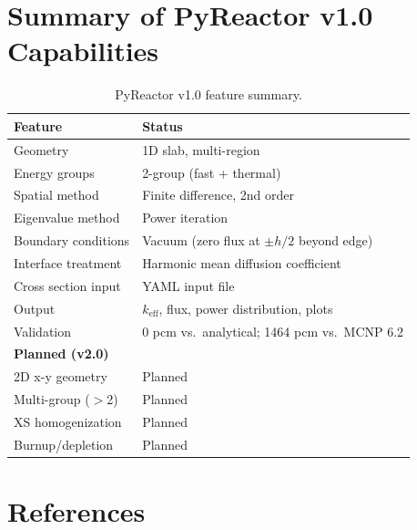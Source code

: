 \documentclass[12pt,a4paper]{article}
\newcommand{\keff}{k_{\mathrm{eff}}}
\begin{document}
\section{Summary of PyReactor v1.0 Capabilities}

\begin{table}[h!]
\centering
\begin{tabular}{ll}
\toprule
\textbf{Feature} & \textbf{Status} \\
\midrule
Geometry              & 1D slab, multi-region \\
Energy groups         & 2-group (fast + thermal) \\
Spatial method        & Finite difference, 2nd order \\
Eigenvalue method     & Power iteration \\
Boundary conditions   & Vacuum (zero flux at $\pm h/2$ beyond edge) \\
Interface treatment   & Harmonic mean diffusion coefficient \\
Cross section input   & YAML input file \\
Output                & $\keff$, flux, power distribution, plots \\
Validation            & 0 pcm vs.\ analytical; 1464 pcm vs.\ MCNP 6.2 \\
\midrule
\textbf{Planned (v2.0)} & \\
\midrule
2D x-y geometry       & Planned \\
Multi-group ($>$2)    & Planned \\
XS homogenization     & Planned \\
Burnup/depletion      & Planned \\
\bottomrule
\end{tabular}
\caption{PyReactor v1.0 feature summary.}
\end{table}

\section{References}
\end{document}
